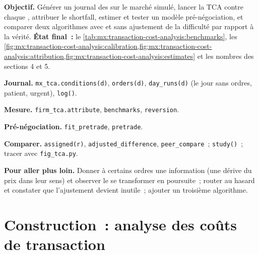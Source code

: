 \begin{tutorial}
\textbf{Objectif.} Générer un journal des  sur le marché simulé, lancer la TCA contre chaque , attribuer le shortfall, estimer et tester un
modèle pré-négociation, et comparer deux algorithmes avec et sans ajustement de la difficulté par rapport à la vérité.
\textbf{État final~:} le \cref{tab:mx:transaction-cost-analysis:benchmarks}, les \cref{fig:mx:transaction-cost-analysis:calibration,fig:mx:transaction-cost-analysis:attribution,fig:mx:transaction-cost-analysis:estimates}
et les nombres des sections 4 et 5.
\begin{tutsteps}
\item \textbf{Journal.} \texttt{mx\_tca.conditions(d)}, \texttt{orders(d)}, \texttt{day\_runs(d)} (le jour sans ordres, patient, urgent),
\texttt{log()}.
\item \textbf{Mesure.} \texttt{firm\_tca.attribute}, \texttt{benchmarks}, \texttt{reversion}.
\item \textbf{Pré-négociation.} \texttt{fit\_pretrade}, \texttt{pretrade}.
\item \textbf{Comparer.} \texttt{assigned(r)}, \texttt{adjusted\_difference}, \texttt{peer\_compare}~; \texttt{study()}~; tracer avec \texttt{fig\_tca.py}.
\end{tutsteps}
\textbf{Pour aller plus loin.} Donner à certains ordres une information (une dérive du prix dans leur sens) et observer le  se transformer en poursuite~; router au
hasard et constater que l'ajustement devient inutile~; ajouter un troisième algorithme.
\end{tutorial}

\section{Construction~: analyse des coûts de transaction}\label{bld:mx:transaction-cost-analysis:tca}


